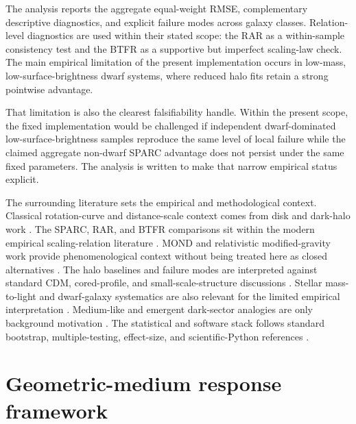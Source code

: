 ﻿\documentclass[twocolumn,linenumbers]{aastex701}
\begin{document}
The analysis reports the aggregate equal-weight RMSE, complementary descriptive diagnostics, and explicit failure modes across galaxy classes. Relation-level diagnostics are used within their stated scope: the RAR as a within-sample consistency test and the BTFR as a supportive but imperfect scaling-law check. The main empirical limitation of the present implementation occurs in low-mass, low-surface-brightness dwarf systems, where reduced halo fits retain a strong pointwise advantage.

That limitation is also the clearest falsifiability handle. Within the present scope, the fixed implementation would be challenged if independent dwarf-dominated low-surface-brightness samples reproduce the same level of local failure while the claimed aggregate non-dwarf SPARC advantage does not persist under the same fixed parameters. The analysis is written to make that narrow empirical status explicit.

The surrounding literature sets the empirical and methodological context. Classical rotation-curve and distance-scale context comes from disk and dark-halo work \citep{freeman1970,tully1977,rubin1978,rubin1980,bosma1981,begeman1991,sofue2001}. The SPARC, RAR, and BTFR comparisons sit within the modern empirical scaling-relation literature \citep{lelli2016,mcgaugh2016,lelli2019,mcgaugh2000,mcgaugh2005,mcgaugh2012,stark2009}. MOND and relativistic modified-gravity work provide phenomenological context without being treated here as closed alternatives \citep{milgrom1983,sanders2002,famaey2012,bekenstein2004,skordis2021,milgrom2014}. The halo baselines and failure modes are interpreted against standard CDM, cored-profile, and small-scale-structure discussions \citep{navarro1997,burkert1995,deblok2001,deblok2008,moore1999,boylankolchin2011,bullock2017,pontzen2012,governato2012,dicintio2014,oman2015,sales2017,maccio2008,dutton2014,planck2020}. Stellar mass-to-light and dwarf-galaxy systematics are also relevant for the limited empirical interpretation \citep{chabrier2003,bell2003,meidt2014,oh2015}. Medium-like and emergent dark-sector analogies are only background motivation \citep{berezhiani2015,verlinde2017}. The statistical and software stack follows standard bootstrap, multiple-testing, effect-size, and scientific-Python references \citep{efron1979,efron1987,wilson1927,cohen1988,holm1979,hunter2007,harris2020,virtanen2020,reback2020}.

\section{Geometric-medium response framework}
\end{document}
